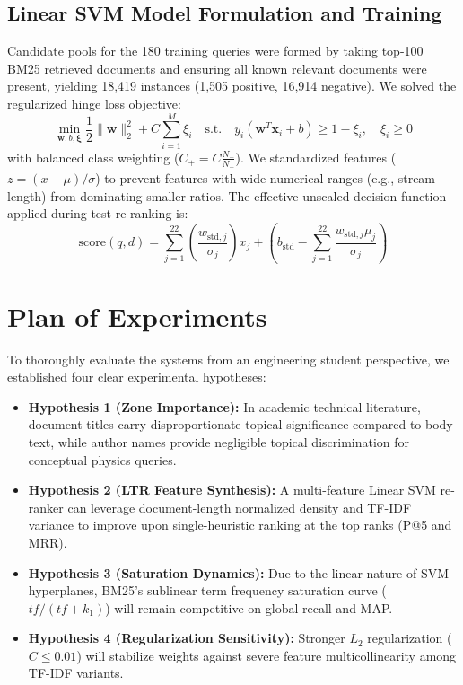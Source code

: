 \documentclass[11pt,a4paper]{article}
\begin{document}
\subsection{Linear SVM Model Formulation and Training}
Candidate pools for the 180 training queries were formed by taking top-100 BM25 retrieved documents and ensuring all known relevant documents were present, yielding 18,419 instances (1,505 positive, 16,914 negative). We solved the regularized hinge loss objective:
\begin{equation}
\min_{\boldsymbol{w}, b, \boldsymbol{\xi}} \frac{1}{2} \|\boldsymbol{w}\|_2^2 + C \sum_{i=1}^M \xi_i \quad \text{s.t.} \quad y_i (\boldsymbol{w}^T \boldsymbol{x}_i + b) \ge 1 - \xi_i, \quad \xi_i \ge 0
\label{eq:svm_objective}
\end{equation}
with balanced class weighting ($C_+ = C \frac{N_-}{N_+}$). We standardized features ($z = (x - \mu)/\sigma$) to prevent features with wide numerical ranges (e.g., stream length) from dominating smaller ratios. The effective unscaled decision function applied during test re-ranking is:
\begin{equation}
\text{score}(q, d) = \sum_{j=1}^{22} \left( \frac{w_{\text{std}, j}}{\sigma_j} \right) x_j + \left( b_{\text{std}} - \sum_{j=1}^{22} \frac{w_{\text{std}, j} \mu_j}{\sigma_j} \right)
\label{eq:svm_unscaled_scoring}
\end{equation}

\section{Plan of Experiments}
To thoroughly evaluate the systems from an engineering student perspective, we established four clear experimental hypotheses:
\begin{itemize}[leftmargin=*]
    \item \textbf{Hypothesis 1 (Zone Importance):} In academic technical literature, document titles carry disproportionate topical significance compared to body text, while author names provide negligible topical discrimination for conceptual physics queries.
    \item \textbf{Hypothesis 2 (LTR Feature Synthesis):} A multi-feature Linear SVM re-ranker can leverage document-length normalized density and TF-IDF variance to improve upon single-heuristic ranking at the top ranks (P@5 and MRR).
    \item \textbf{Hypothesis 3 (Saturation Dynamics):} Due to the linear nature of SVM hyperplanes, BM25's sublinear term frequency saturation curve ($tf / (tf + k_1)$) will remain competitive on global recall and MAP.
    \item \textbf{Hypothesis 4 (Regularization Sensitivity):} Stronger $L_2$ regularization ($C \le 0.01$) will stabilize weights against severe feature multicollinearity among TF-IDF variants.
\end{itemize}
\end{document}

